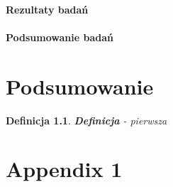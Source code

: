 \documentclass[twoside]{iisthesis}
\newtheorem{mydef}{Definicja}
\begin{document}
\subsubsection{Rezultaty badań}
\subsubsection{Podsumowanie badań}

\chapter{Podsumowanie}

\begin{mydef}
\textbf{Definicja} - pierwsza
\end{mydef}




 \clearpage
\appendix
\chapter{Appendix 1}


\clearpage
\pagestyle{plain}
\listofmyfigure
\listofmyequations
\listofmyalgorithm
\clearpage




\end{document}
